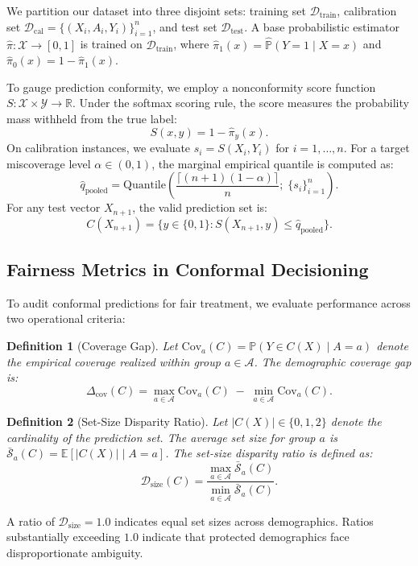 \documentclass[conference]{IEEEtran}
\newtheorem{definition}{Definition}
\begin{document}
We partition our dataset into three disjoint sets: training set $\mathcal{D}_{\text{train}}$, calibration set $\mathcal{D}_{\text{cal}} = \{(X_i, A_i, Y_i)\}_{i=1}^{n}$, and test set $\mathcal{D}_{\text{test}}$. A base probabilistic estimator $\hat{\pi}: \mathcal{X} \to [0, 1]$ is trained on $\mathcal{D}_{\text{train}}$, where $\hat{\pi}_1(x) = \hat{\mathbb{P}}(Y = 1 \mid X = x)$ and $\hat{\pi}_0(x) = 1 - \hat{\pi}_1(x)$.

To gauge prediction conformity, we employ a nonconformity score function $S: \mathcal{X} \times \mathcal{Y} \to \mathbb{R}$. Under the softmax scoring rule, the score measures the probability mass withheld from the true label:
\begin{equation}
S(x, y) = 1 - \hat{\pi}_y(x).
\end{equation}
On calibration instances, we evaluate $s_i = S(X_i, Y_i)$ for $i = 1, \dots, n$. For a target miscoverage level $\alpha \in (0, 1)$, the marginal empirical quantile is computed as:
\begin{equation}
\label{eq:marginal_q}
\hat{q}_{\text{pooled}} = \text{Quantile}\left( \frac{\lceil (n+1)(1-\alpha) \rceil}{n};\; \{s_i\}_{i=1}^n \right).
\end{equation}
For any test vector $X_{n+1}$, the valid prediction set is:
\begin{equation}
C(X_{n+1}) = \bigl\{ y \in \{0, 1\} : S(X_{n+1}, y) \le \hat{q}_{\text{pooled}} \bigr\}.
\end{equation}

\subsection{Fairness Metrics in Conformal Decisioning}
To audit conformal predictions for fair treatment, we evaluate performance across two operational criteria:

\begin{definition}[Coverage Gap]
Let $\text{Cov}_a(C) = \mathbb{P}(Y \in C(X) \mid A = a)$ denote the empirical coverage realized within group $a \in \mathcal{A}$. The demographic coverage gap is:
\begin{equation}
\Delta_{\text{cov}}(C) = \max_{a \in \mathcal{A}} \text{Cov}_a(C) \;-\; \min_{a \in \mathcal{A}} \text{Cov}_a(C).
\end{equation}
\end{definition}

\begin{definition}[Set-Size Disparity Ratio]
Let $|C(X)| \in \{0, 1, 2\}$ denote the cardinality of the prediction set. The average set size for group $a$ is $\bar{\mathcal{S}}_a(C) = \mathbb{E}[|C(X)| \mid A = a]$. The set-size disparity ratio is defined as:
\begin{equation}
\mathcal{D}_{\text{size}}(C) = \frac{\max_{a \in \mathcal{A}} \bar{\mathcal{S}}_a(C)}{\min_{a \in \mathcal{A}} \bar{\mathcal{S}}_a(C)}.
\end{equation}
\end{definition}
A ratio of $\mathcal{D}_{\text{size}} = 1.0$ indicates equal set sizes across demographics. Ratios substantially exceeding $1.0$ indicate that protected demographics face disproportionate ambiguity.
\end{document}
